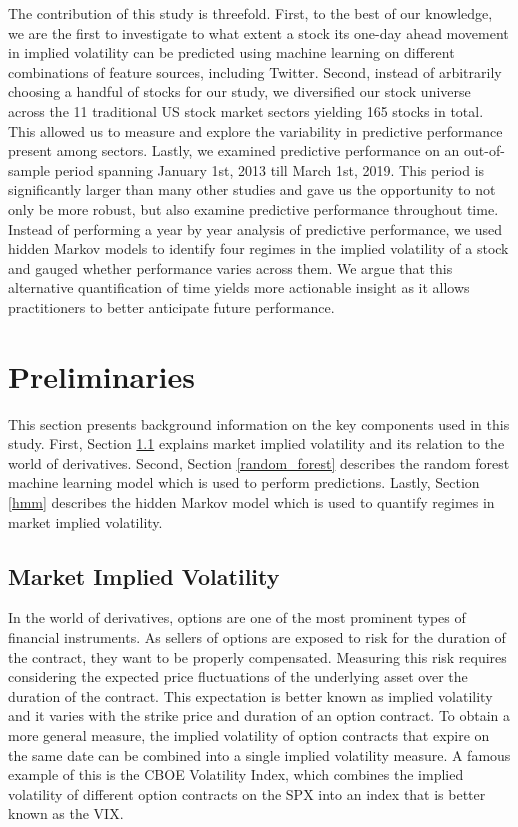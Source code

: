 \documentclass[preprint,1p, times,authoryear]{elsarticle}
\begin{document}
The contribution of this study is threefold. First, to the best of our knowledge, we are the first to investigate to what extent a stock its one-day ahead movement in implied volatility can be predicted using machine learning on different combinations of feature sources, including Twitter. Second, instead of arbitrarily choosing a handful of stocks for our study, we diversified our stock universe across the 11 traditional US stock market sectors yielding 165 stocks in total. This allowed us to measure and explore the variability in predictive performance present among sectors. Lastly, we examined predictive performance on an out-of-sample period spanning January 1st, 2013 till March 1st, 2019. This period is significantly larger than many other studies and gave us the opportunity to not only be more robust, but also examine predictive performance throughout time. Instead of performing a year by year analysis of predictive performance, we used hidden Markov models to identify four regimes in the implied volatility of a stock and gauged whether performance varies across them. We argue that this alternative quantification of time yields more actionable insight as it allows practitioners to better anticipate future performance.

\section{Preliminaries}
This section presents background information on the key components used in this study. First, Section \ref{implied_section} explains market implied volatility and its relation to the world of derivatives. Second, Section \ref{random_forest} describes the random forest machine learning model which is used to perform predictions. Lastly, Section \ref{hmm} describes the hidden Markov model which is used to quantify regimes in market implied volatility. 

\subsection{Market Implied Volatility} 
\label{implied_section}
In the world of derivatives, options are one of the most prominent types of financial instruments. As sellers of options are exposed to risk for the duration of the contract, they want to be properly compensated. Measuring this risk requires considering the expected price fluctuations of the underlying asset over the duration of the contract. 
This expectation is better known as implied volatility and it varies with the strike price and duration of an option contract. To obtain a more general measure, the implied volatility of option contracts that expire on the same date can be combined into a single implied volatility measure. A famous example of this is the CBOE Volatility Index, which combines the implied volatility of different option contracts on the SPX into an index that is better known as the VIX. 
\end{document}
